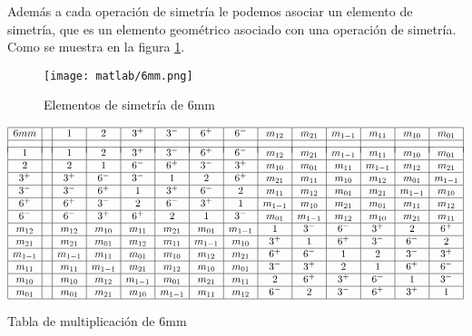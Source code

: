 \documentclass{report}
\begin{document}
\vspace{.2cm}

Además a cada operación de simetría le podemos asociar un elemento de simetría, que es un elemento geométrico asociado con una operación de simetría. Como se muestra en la figura \ref{6mm}. \\


\vspace{.2cm}


\begin{figure}[h!]
\centering
\texttt{[image: matlab/6mm.png]}
\caption{Elementos de simetría de 6mm}
\label{6mm} 
\end{figure}



\begin{table}[h!]
\centering

   \[
\begin{array}{|c|c|c|c|c|c|c|c|c|c|c|c|c|c|}
\hline
6mm & & 1    & 2    & 3^+  & 3^-  & 6^+  & 6^-  & m_{12} & m_{21} & m_{1-1} & m_{11} & m_{10} & m_{01}\\
\hline
\vspace{-.2cm}
 & &     &     &   &  &  &   &  &  &  &  &  & \\
\hline
1 & & 1    & 2    & 3^+  & 3^-  & 6^+  & 6^-  & m_{12} & m_{21} & m_{1-1} & m_{11} & m_{10} & m_{01}\\
\hline
2 & & 2    & 1    & 6^-  & 6^+  & 3^-  & 3^+  & m_{10} & m_{01} & m_{11} & m_{1-1} & m_{12} & m_{21}\\
\hline
3^+& & 3^+  & 6^-  & 3^-  & 1    & 2    & 6^+  & m_{21} & m_{11} & m_{10} & m_{12} & m_{01} & m_{1-1}\\
\hline
3^-& & 3^-  & 6^+  & 1    & 3^+  & 6^-  & 2    & m_{11} & m_{12} & m_{01} & m_{21} & m_{1-1} & m_{10}\\
\hline
6^+& & 6^+  & 3^-  & 2    & 6^-  & 3^+  & 1    & m_{1-1} & m_{10} & m_{21} & m_{01} & m_{11} & m_{12}\\
\hline
6^-& & 6^-  & 3^+  & 6^+  & 2    & 1    & 3^-  & m_{01} & m_{1-1} & m_{12} & m_{10} & m_{21} & m_{11}\\
\hline
m_{12}& & m_{12} & m_{10} & m_{11} & m_{21} & m_{01} & m_{1-1} & 1    & 3^-  & 6^-  & 3^+   & 2  & 6^+\\
\hline
m_{21}& & m_{21} & m_{01} & m_{12} & m_{11} & m_{1-1} & m_{10} & 3^+  & 1    & 6^+  & 3^-  & 6^-    & 2\\
\hline
m_{1-1}& & m_{1-1} & m_{11} & m_{01} & m_{10} & m_{12} & m_{21}& 6^+  & 6^-  & 1    & 2  & 3^- & 3^+\\
\hline
m_{11}& & m_{11} & m_{1-1} & m_{21} & m_{12} & m_{10} & m_{01}  & 3^-    & 3^+  & 2  & 1    & 6^+  & 6^-\\
\hline
m_{10}& & m_{10} & m_{12} & m_{1-1} & m_{01} & m_{21} & m_{11} & 2 & 6^+   & 3^+  & 6^-  & 1    & 3^-\\
\hline
m_{01} & & m_{01} & m_{21} & m_{10} & m_{1-1} & m_{11} & m_{12}  & 6^-  & 2  & 3^-    & 6^+ & 3^+  & 1\\
\hline
\end{array}
\]

\caption{Tabla de multiplicación de 6mm}
\label{raiza}
\end{table}
\end{document}
